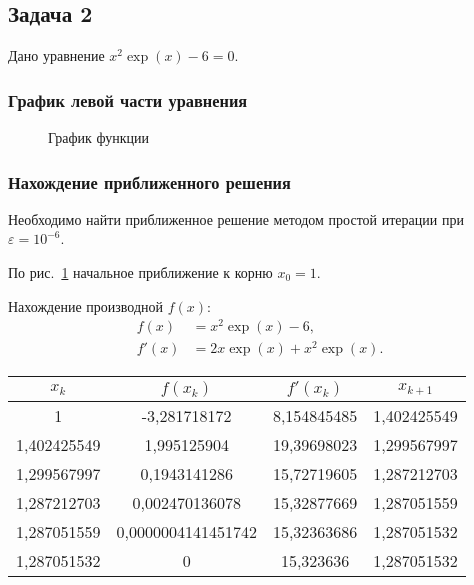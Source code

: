 \documentclass[10pt, a4paper, titlepage]{article}
\begin{document}
\subsection{Задача 2}

Дано уравнение $x^2\exp(x)-6=0$.

\subsubsection*{График левой части уравнения}
\begin{figure}[H]
    \centering
    \caption{График функции}
    \label{sr1Task2Function}
\end{figure}

\subsubsection*{Нахождение приближенного решения}

Необходимо найти приближенное решение методом простой итерации при $\varepsilon=10^{-6}$.

По рис.~\ref{sr1Task2Function} начальное приближение к корню $x_0=1$.

Нахождение производной $f(x)$:
\begin{align*}
f(x) &= x^2\exp(x)-6, \\ 
f'(x) &= 2x\exp(x)+x^2\exp(x).
\end{align*}

\begin{center}
    \begin{tabular}{|c|c|c|c|}
        \hline
        $x_k$ & $f(x_k)$ & $f'(x_k)$ & $x_{k+1}$ \\ \hline
        
        1 & -3,281718172 & 8,154845485 & 1,402425549 \\ \hline
        
        1,402425549 & 1,995125904 & 19,39698023 & 1,299567997 \\ \hline
        
        1,299567997 & 0,1943141286 & 15,72719605 & 1,287212703 \\ \hline
        
        1,287212703 & 0,002470136078 & 15,32877669 & 1,287051559 \\ \hline
        
        1,287051559 & 0,0000004141451742 & 15,32363686 & 1,287051532 \\ \hline
        
        1,287051532 & 0 & 15,323636 & 1,287051532 \\ \hline
        
    \end{tabular}
\end{center}
\end{document}
